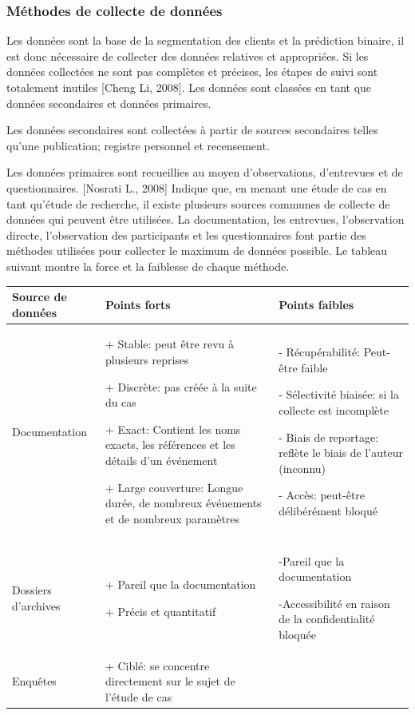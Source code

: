 \documentclass[12pt]{article}
\begin{document}
{\subsubsection{Méthodes de collecte de données}
Les données sont la base de la segmentation des clients et la prédiction binaire, il est donc nécessaire de collecter des données relatives et appropriées. Si les données collectées ne sont pas complètes et précises, les étapes de suivi sont totalement inutiles {\color{red}[Cheng Li, 2008]}.
Les données sont classées en tant que données secondaires et données primaires.

Les données secondaires sont collectées à partir de sources secondaires telles qu’une publication; registre personnel et recensement. 

Les données primaires sont recueillies au moyen d'observations, d'entrevues et de questionnaires. {\color{red}[Nosrati L., 2008]} Indique que, en menant une étude de cas en tant qu'étude de recherche, il existe plusieurs sources communes de collecte de données qui peuvent être utilisées. La documentation, les entrevues, l'observation directe, l'observation des participants et les questionnaires font partie des méthodes utilisées pour collecter le maximum de données possible. Le tableau suivant montre la force et la faiblesse de chaque méthode.

\begin{center}
\begin{tabular}{|p{3cm}|p{6cm}|p{6cm}|}
\hline
   Source de données & Points forts & Points faibles \\
  \hline
    Documentation &+ Stable: peut être revu à plusieurs reprises
    
+ Discrète: pas créée à la suite du cas

+ Exact: Contient les noms exacts, les références et les détails d'un événement

+ Large couverture: Longue durée, de nombreux événements et de nombreux paramètres
 & - Récupérabilité: Peut-être faible
 
- Sélectivité biaisée: si la collecte est incomplète

- Biais de reportage: reflète le biais de l'auteur (inconnu)

- Accès: peut-être délibérément bloqué
\\
  \hline
   Dossiers d'archives&+ Pareil que la documentation 
   
+ Précis et quantitatif
& -Pareil que la documentation 

-Accessibilité en raison de la confidentialité bloquée
 \\
  \hline
 Enquêtes& + Ciblé: se concentre directement sur le sujet de l'étude de cas
 

\end{tabular}
\end{center}}
\end{document}

